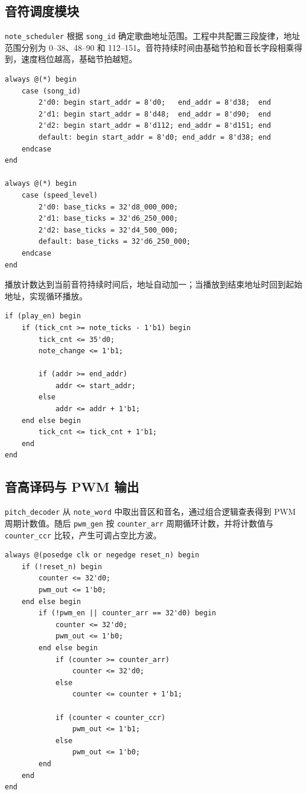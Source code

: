\documentclass[UTF8,a4paper,12pt]{ctexart}
\begin{document}
\subsection{音符调度模块}

\verb|note_scheduler| 根据 \verb|song_id| 确定歌曲地址范围。工程中共配置三段旋律，地址范围分别为 0--38、48--90 和 112--151。音符持续时间由基础节拍和音长字段相乘得到，速度档位越高，基础节拍越短。

\begin{lstlisting}[style=svstyle,caption={歌曲地址范围和速度节拍选择}]
always @(*) begin
    case (song_id)
        2'd0: begin start_addr = 8'd0;   end_addr = 8'd38;  end
        2'd1: begin start_addr = 8'd48;  end_addr = 8'd90;  end
        2'd2: begin start_addr = 8'd112; end_addr = 8'd151; end
        default: begin start_addr = 8'd0; end_addr = 8'd38; end
    endcase
end

always @(*) begin
    case (speed_level)
        2'd0: base_ticks = 32'd8_000_000;
        2'd1: base_ticks = 32'd6_250_000;
        2'd2: base_ticks = 32'd4_500_000;
        default: base_ticks = 32'd6_250_000;
    endcase
end
\end{lstlisting}

播放计数达到当前音符持续时间后，地址自动加一；当播放到结束地址时回到起始地址，实现循环播放。

\begin{lstlisting}[style=svstyle,caption={音符地址推进逻辑}]
if (play_en) begin
    if (tick_cnt >= note_ticks - 1'b1) begin
        tick_cnt <= 35'd0;
        note_change <= 1'b1;

        if (addr >= end_addr)
            addr <= start_addr;
        else
            addr <= addr + 1'b1;
    end else begin
        tick_cnt <= tick_cnt + 1'b1;
    end
end
\end{lstlisting}

\subsection{音高译码与 PWM 输出}

\verb|pitch_decoder| 从 \verb|note_word| 中取出音区和音名，通过组合逻辑查表得到 PWM 周期计数值。随后 \verb|pwm_gen| 按 \verb|counter_arr| 周期循环计数，并将计数值与 \verb|counter_ccr| 比较，产生可调占空比方波。

\begin{lstlisting}[style=svstyle,caption={PWM 发生器核心逻辑}]
always @(posedge clk or negedge reset_n) begin
    if (!reset_n) begin
        counter <= 32'd0;
        pwm_out <= 1'b0;
    end else begin
        if (!pwm_en || counter_arr == 32'd0) begin
            counter <= 32'd0;
            pwm_out <= 1'b0;
        end else begin
            if (counter >= counter_arr)
                counter <= 32'd0;
            else
                counter <= counter + 1'b1;

            if (counter < counter_ccr)
                pwm_out <= 1'b1;
            else
                pwm_out <= 1'b0;
        end
    end
end
\end{lstlisting}
\end{document}
